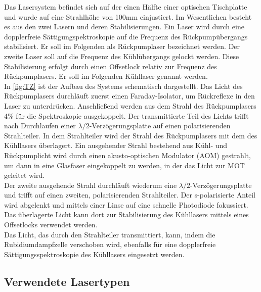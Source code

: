 \documentclass[
class=book,
accentcolor=1b,
custommargins=geometry,
fontsize=11pt,
thesis={type=Versuchsanleitung},
ruledheaders=all,
headline=false,
instbox=false,
marginpar=false,
title=small,
ignore-missing-data=true,
twoside=false,
logofile=apqdesign/tuda_logo.pdf,
pdfa=false %
]{apqpub}
\begin{document}
			Das Lasersystem befindet sich auf der einen Hälfte einer optischen Tischplatte und wurde auf eine Strahlhöhe von 100mm einjustiert. Im Wesentlichen besteht es aus den zwei Lasern und deren Stabilisierungen. Ein Laser wird durch eine dopplerfreie Sättigungspektroskopie auf die Frequenz des Rückpumpübergangs stabilisiert. Er soll im Folgenden als Rückpumplaser bezeichnet werden. Der zweite Laser soll auf die Frequenz des Kühlübergangs gelockt werden. Diese Stabilisierung erfolgt durch einen Offsetlock relativ zur Frequenz des Rückpumplasers. Er soll im Folgenden Kühllaser genannt werden.\\
			In \autoref{fig:TZ} ist der Aufbau des Systems schematisch dargestellt. Das Licht des Rückpumplasers durchläuft zuerst einen Faraday-Isolator, um Rückreflexe in den Laser zu unterdrücken. Anschließend werden aus dem Strahl des Rückpumplasers 4\% für die Spektroskopie ausgekoppelt. Der transmittierte Teil des Lichts trifft nach Durchlaufen einer $\lambda/2$-Verzögerungsplatte auf einen polarisierenden Strahlteiler. In dem Strahlteiler wird der Strahl des Rückpumplasers mit dem des Kühllasers überlagert. Ein ausgehender Strahl bestehend aus Kühl- und Rückpumplicht wird durch einen akusto-optischen Modulator (AOM) gestrahlt, um dann in eine Glasfaser eingekoppelt zu werden, in der das Licht zur MOT geleitet wird.\\
			Der zweite ausgehende Strahl durchläuft wiederum eine $\lambda/2$-Verzögerungsplatte und trifft auf einen zweiten, polarisierenden Strahlteiler. Der s-polarisierte Anteil wird abgelenkt und mittels einer Linse auf eine schnelle Photodiode fokussiert. Das überlagerte Licht kann dort zur Stabilisierung des Kühllasers mittels eines Offsetlocks verwendet werden.\\
			Das Licht, das durch den Strahlteiler transmittiert, kann, indem die Rubidiumdampfzelle verschoben wird, ebenfalls für eine dopplerfreie Sättigungsspektroskopie des Kühllasers eingesetzt werden.\\
			
			\subsection{Verwendete Lasertypen}
			
\end{document}
